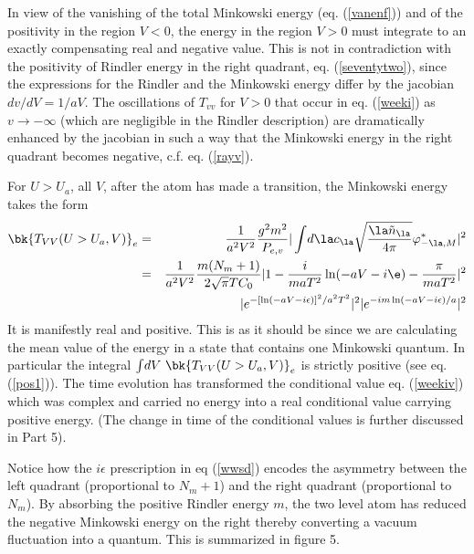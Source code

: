 \documentclass[12pt]{article}
\begin{document}
In view
of the vanishing of the total Minkowski energy (eq. (\ref{vanenf})) and of
the positivity  in the region $V<0$, the
energy in the region $V>0$ must integrate to an exactly compensating real
and negative value. This is not
in contradiction with the positivity of Rindler energy in the right quadrant,
eq. (\ref{seventytwo}),
since the expressions for the Rindler and the Minkowski energy differ by the
jacobian ${ dv / dV} = {1 / aV}$. The oscillations of $T_{vv}$ for
$V>0$ that occur in eq. (\ref{weeki}) as $v \rightarrow - \infty$ (which are
negligible in
the Rindler description) are dramatically enhanced by the jacobian in such a
way that the Minkowski energy in the right quadrant becomes negative, c.f.
eq. (\ref{rayv}).






For $U>U_a$, all $V$,
after the atom has made a transition, the Minkowski energy takes the
form \begin{eqnarray}
\bk{T_{VV}(U>U_a,V)}_{ e} &=&
{1 \over a^2 V^2}{ g^2 m^2 \over
P_{e,v}} \vert \int\! d\la c_\la
\sqrt{ {
\la \tilde n_\la \over 4 \pi}} \varphi_{-\la, M}^*
\vert^2\nonumber\\
&=&{1 \over a^2 V^2} {m (N_m + 1)\over  2 \sqrt{\pi} T C_0} \vert 1 -
{i \over m a
T^2} \ln (-aV-i\e) -  {\pi\over m a T^2}  \vert^2
\nonumber\\
&&\quad\quad
  \vert e^{-{\left[ \ln (-aV-i\epsilon) \right]^2 / a^2 T^2}} \vert^2 \vert
e^{-i{m }\ln (-aV-i\epsilon)/ a } \vert^2  \label{wwsd}\end{eqnarray}
It is manifestly real and positive. This is as it should be since we are
calculating the mean value of the energy in a state that contains one
Minkowski quantum.
In particular the integral $\int\! dV \ \bk{T_{VV}(U>U_a,V)}_{ e}$ is
strictly positive (see eq. (\ref{pos1})). The time evolution has transformed
the conditional value eq. (\ref{weekiv}) which was complex and carried no
energy into a real conditional value carrying positive energy. (The change in
time of the conditional values is further discussed in Part 5).

Notice how the $i\epsilon$ prescription in eq (\ref{wwsd}) encodes the
asymmetry between the left quadrant (proportional to $N_m+1$) and the right
quadrant (proportional to $N_m$).
By absorbing the positive Rindler energy $m$, the two level atom has reduced
the negative Minkowski energy on the right thereby converting a vacuum
fluctuation into a quantum. This is summarized in figure 5.
\end{document}
